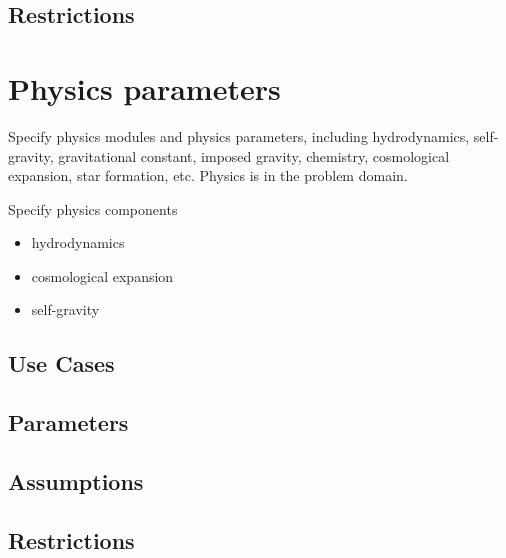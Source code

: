 \documentclass{book}
\begin{document}
\subsection{Restrictions}

\section{Physics parameters} \label{s:physics}

Specify physics modules and physics parameters, including
hydrodynamics, self-gravity, gravitational constant, imposed gravity,
chemistry, cosmological expansion, star formation, etc.  Physics is in
the problem domain.

Specify physics components

\begin{itemize}
\item hydrodynamics
\item  cosmological expansion
\item self-gravity
\end{itemize}

\subsection{Use Cases}
\subsection{Parameters}
\subsection{Assumptions}
\subsection{Restrictions}
\end{document}
